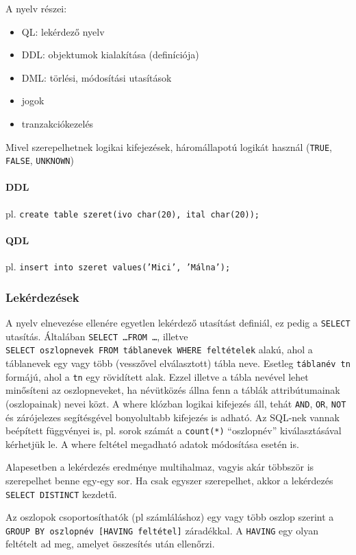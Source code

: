 \documentclass[fleqn,10pt,a4paper]{article}
\theoremstyle{magyar}
\begin{document}
  A nyelv részei:
  \begin{itemize}
  \item QL:  lekérdező nyelv
  \item DDL: objektumok kialakítása (definíciója)
  \item DML: törlési, módosítási utasítások
  \item jogok
  \item tranzakciókezelés
  \end{itemize}
  
  Mivel szerepelhetnek logikai kifejezések, háromállapotú logikát használ
  (\texttt{TRUE}, \texttt{FALSE}, \texttt{UNKNOWN})
  
  \paragraph{DDL} pl. \texttt{create table szeret(ivo char(20), ital char(20));}
  \paragraph{QDL} pl. \texttt{insert into szeret values('Mici', 'Málna');}
  \subsubsection{Lekérdezések} A nyelv elnevezése ellenére egyetlen lekérdező utasítást definiál, ez pedig a
  \texttt{SELECT} utasítás. Általában \texttt{SELECT \ldots FROM \ldots}, illetve\\ \texttt{SELECT oszlopnevek FROM
    táblanevek WHERE feltételek} alakú, ahol a táblanevek egy vagy több (vesszővel elválasztott) tábla neve. Esetleg
  \texttt{táblanév tn} formájú, ahol a \texttt{tn} egy rövidített alak. Ezzel illetve a tábla nevével lehet minősíteni
  az oszlopneveket, ha névütközés állna fenn a táblák attribútumainak (oszlopainak) nevei közt. A where klózban
  logikai kifejezés áll, tehát \texttt{AND}, \texttt{OR}, \texttt{NOT} és zárójelezes segítésgével bonyolultabb
  kifejezés is  adható. Az SQL-nek vannak beépített függvényei is, pl. sorok számát a \texttt{count(*)} ``oszlopnév''
  kiválasztásával kérhetjük le. A where feltétel megadható adatok módosítása esetén is.

  Alapesetben a lekérdezés eredménye multihalmaz, vagyis akár többször is szerepelhet benne egy-egy sor. Ha csak egyszer
  szerepelhet, akkor a lekérdezés \texttt{SELECT DISTINCT} kezdetű.

  Az oszlopok csoportosíthatók (pl számláláshoz) egy vagy több oszlop szerint a \texttt{GROUP BY oszlopnév [HAVING
      feltétel]} záradékkal. A \texttt{HAVING} egy olyan feltételt ad meg, amelyet összesítés után ellenőrzi.
\end{document}
